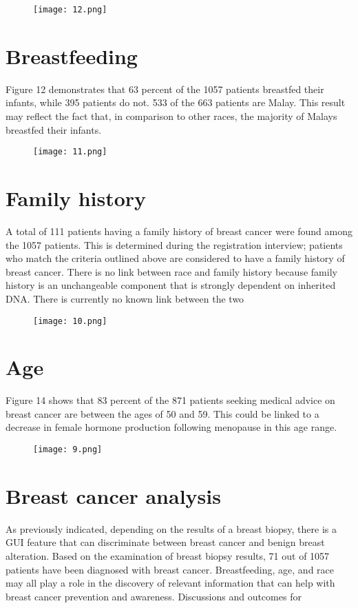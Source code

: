 \documentclass[10pt,a4paper,twoside]{article}
\begin{document}
\begin{figure}
  \texttt{[image: 12.png]}
  
  
  
\end{figure}
\section{Breastfeeding}
Figure 12 demonstrates that 63 percent of the 1057 patients breastfed their infants, while 395 patients do not.
533 of the 663 patients are Malay. This result may reflect the fact that, in comparison to other races, the majority of Malays breastfed their infants.
\begin{figure}
  \texttt{[image: 11.png]}
  
  
  
\end{figure}

\section{Family history}
A total of 111 patients having a family history of breast cancer were found among the 1057 patients. This is determined during the registration interview; patients who match the criteria outlined above are considered to have a family history of breast cancer.
There is no link between race and family history because family history is an unchangeable component that is strongly dependent on inherited DNA. There is currently no known link between the two


\begin{figure}
  \texttt{[image: 10.png]}
  
  
  
\end{figure}

\section{Age}
Figure 14 shows that 83 percent of the 871 patients seeking medical advice on breast cancer are between the ages of 50 and 59. This could be linked to a decrease in female hormone production following menopause in this age range.
\begin{figure}
  \texttt{[image: 9.png]}
  
  
  
\end{figure}
\section{Breast cancer analysis}
As previously indicated, depending on the results of a breast biopsy, there is a GUI feature that can discriminate between breast cancer and benign breast alteration. Based on the examination of breast biopsy results, 71 out of 1057 patients have been diagnosed with breast cancer. Breastfeeding, age, and race may all play a role in the discovery of relevant information that can help with breast cancer prevention and awareness. Discussions and outcomes for
\end{document}
